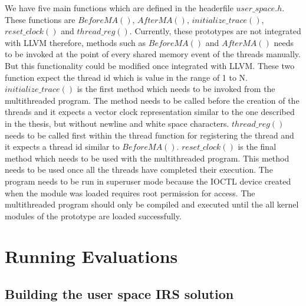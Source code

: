 \documentclass[12pt]{article}
\begin{document}
We have five main functions which are defined in the headerfile $user\_space.h$. 
These functions are $BeforeMA()$, $AfterMA()$, $initialize\_trace()$, $reset\_clock()$ and $thread\_reg()$. 
Currently, these prototypes are not integrated with LLVM therefore, methods such as $BeforeMA()$ and $AfterMA()$ needs to be invoked at the point of every shared memory event of the threads manually. 
But this functionality could be modified once integrated with LLVM. 
These two function expect the thread id which is value in the range of 1 to N. 
$initialize\_trace()$ is the first method which needs to be invoked from the multithreaded program. 
The method needs to be called before the creation of the threads and it expects a vector clock representation similar to the one described in the thesis, but without newline and white space characters. 
$thread\_reg()$ needs to be called first within the thread function for registering the thread and it expects a thread id similar to $BeforeMA()$. 
$reset\_clock()$ is the final method which needs to be used with the multithreaded program. 
This method needs to be used once all the threads have completed their execution. 
The program needs to be run in superuser mode because the IOCTL device created when the module was loaded requires root permission for access. 
The multithreaded program should only be compiled and executed until the all kernel modules of the prototype are loaded successfully.  
\newpage
\section*{Running Evaluations} 
\subsection*{Building the user space IRS solution}
\end{document}
